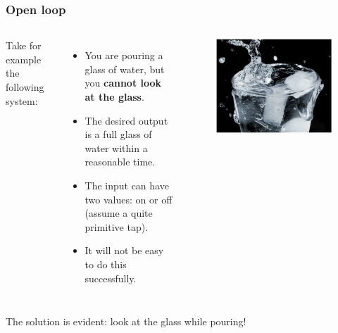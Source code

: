 \documentclass{beamer}
\begin{document}
\begin{frame}
\frametitle{Open loop}
\begin{columns}[c]

Take for example the following system:\\
\begin{itemize}
\item You are pouring a glass of water, but you \textbf{cannot look at the glass}.
\item The desired output is a full glass of water within a reasonable time.
\item The input can have two values: on or off (assume a quite primitive tap).
\item It will not be easy to do this successfully.
\end{itemize}

\begin{figure}
\includegraphics[width=1\linewidth]{glass}
\end{figure}

\end{columns}
\bigskip
The solution is evident: look at the glass while pouring!
\end{frame}

\end{document}
